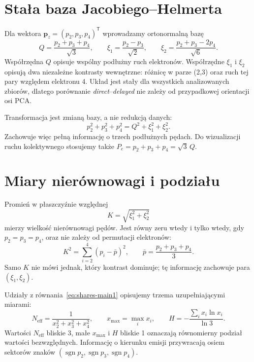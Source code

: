 \documentclass[12pt,letterpaper,oneside]{report}
\numberwithin{equation}{chapter}
\numberwithin{figure}{chapter}
\numberwithin{table}{chapter}
\newcommand{\Pe}{\ensuremath{P_e}}
\begin{document}
\section{Stała baza Jacobiego--Helmerta}

Dla wektora \(\mathbf p_z=(p_2,p_3,p_4)^{\mathsf T}\) wprowadzamy
ortonormalną bazę
\begin{equation}
Q=\frac{p_2+p_3+p_4}{\sqrt3},\qquad
\xi_1=\frac{p_2-p_3}{\sqrt2},\qquad
\xi_2=\frac{p_2+p_3-2p_4}{\sqrt6}.
\label{eq:helmert-main1}
\end{equation}
Współrzędna \(Q\) opisuje wspólny podłużny ruch elektronów.
Współrzędne \(\xi_1\) i \(\xi_2\) opisują dwa niezależne kontrasty
wewnętrzne: różnicę w parze (2,3) oraz ruch tej pary względem elektronu
4. Układ jest stały dla wszystkich analizowanych zbiorów, dlatego
porównanie \textit{direct}--\textit{delayed} nie zależy od przypadkowej
orientacji osi PCA.

Transformacja jest zmianą bazy, a nie redukcją danych:
\begin{equation}
p_2^2+p_3^2+p_4^2=Q^2+\xi_1^2+\xi_2^2.
\label{eq:norm-main1}
\end{equation}
Zachowuje więc pełną informację o trzech podłużnych pędach. Do
wizualizacji ruchu kolektywnego stosujemy także
\(\Pe{}=p_2+p_3+p_4=\sqrt3\,Q\).

\section{Miary nierównowagi i podziału}

Promień w płaszczyźnie względnej
\begin{equation}
K=\sqrt{\xi_1^2+\xi_2^2}
\label{eq:k-main1}
\end{equation}
mierzy wielkość nierównowagi pędów. Jest równy zeru wtedy i tylko wtedy,
gdy \(p_2=p_3=p_4\), oraz nie zależy od permutacji elektronów:
\[
K^2=\sum_{i=2}^{4}(p_i-\bar p)^2,\qquad
\bar p=\frac{p_2+p_3+p_4}{3}.
\]
Samo \(K\) nie mówi jednak, który kontrast dominuje; tę informację
zachowuje para \((\xi_1,\xi_2)\).

Udziały z równania~\eqref{eq:shares-main1} opisujemy trzema
uzupełniającymi miarami:
\[
N_{\mathrm{eff}}=\frac{1}{x_2^2+x_3^2+x_4^2},\qquad
x_{\max}=\max_i x_i,\qquad
H=-\frac{\sum_i x_i\ln x_i}{\ln3}.
\]
Wartości \(N_{\mathrm{eff}}\) bliskie 3, małe \(x_{\max}\) i \(H\)
bliskie 1 oznaczają równomierny podział wartości bezwzględnych.
Informację o kierunku emisji przywracają osiem sektorów znaków
\((\operatorname{sgn}p_2,\operatorname{sgn}p_3,\operatorname{sgn}p_4)\).
\end{document}
